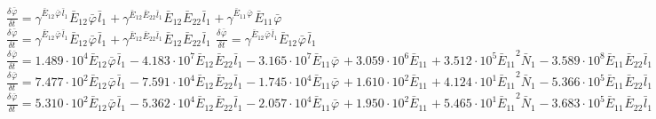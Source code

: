 $\frac{{\delta}^{} {\bar{\varphi}}_{}}{{\delta} {{{t}}_{}}^{}} = {\gamma}^{{{{\bar{E}}_{12}}^{}{{\bar{\varphi}}_{}}^{}{{\bar{l}}_{1}}^{}}}{{{\bar{E}}_{12}}^{}{{\bar{\varphi}}_{}}^{}{{\bar{l}}_{1}}^{}} + {\gamma}^{{{{\bar{E}}_{12}}^{}{{\bar{E}}_{22}}^{}{{\bar{l}}_{1}}^{}}}{{{\bar{E}}_{12}}^{}{{\bar{E}}_{22}}^{}{{\bar{l}}_{1}}^{}} + {\gamma}^{{{{\bar{E}}_{11}}^{}{{\bar{\varphi}}_{}}^{}}}{{{\bar{E}}_{11}}^{}{{\bar{\varphi}}_{}}^{}}$
$\frac{{\delta}^{} {\bar{\varphi}}_{}}{{\delta} {{{t}}_{}}^{}} = {\gamma}^{{{{\bar{E}}_{12}}^{}{{\bar{\varphi}}_{}}^{}{{\bar{l}}_{1}}^{}}}{{{\bar{E}}_{12}}^{}{{\bar{\varphi}}_{}}^{}{{\bar{l}}_{1}}^{}} + {\gamma}^{{{{\bar{E}}_{12}}^{}{{\bar{E}}_{22}}^{}{{\bar{l}}_{1}}^{}}}{{{\bar{E}}_{12}}^{}{{\bar{E}}_{22}}^{}{{\bar{l}}_{1}}^{}}$
$\frac{{\delta}^{} {\bar{\varphi}}_{}}{{\delta} {{{t}}_{}}^{}} = {\gamma}^{{{{\bar{E}}_{12}}^{}{{\bar{\varphi}}_{}}^{}{{\bar{l}}_{1}}^{}}}{{{\bar{E}}_{12}}^{}{{\bar{\varphi}}_{}}^{}{{\bar{l}}_{1}}^{}}$
$\frac{{\delta}^{} {\bar{\varphi}}_{}}{{\delta} {{{t}}_{}}^{}} = 1.489\cdot 10^{4}{{{\bar{E}}_{12}}^{}{{\bar{\varphi}}_{}}^{}{{\bar{l}}_{1}}^{}} - 4.183\cdot 10^{7}{{{\bar{E}}_{12}}^{}{{\bar{E}}_{22}}^{}{{\bar{l}}_{1}}^{}} - 3.165\cdot 10^{7}{{{\bar{E}}_{11}}^{}{{\bar{\varphi}}_{}}^{}} + 3.059\cdot 10^{6}{{{\bar{E}}_{11}}^{}} + 3.512\cdot 10^{5}{{{\bar{E}}_{11}}^{2}{{\bar{N}}_{1}}^{}} - 3.589\cdot 10^{8}{{{\bar{E}}_{11}}^{}{{\bar{E}}_{22}}^{}{{\bar{l}}_{1}}^{}} + 5.223\cdot 10^{6}{{{\bar{E}}_{11}}^{}{{\bar{\varphi}}_{}}^{}{{\bar{l}}_{1}}^{}} + 5.855\cdot 10^{6}{{{\bar{E}}_{22}}^{2}{{\bar{l}}_{1}}^{}} + 7.608\cdot 10^{5}{{{\bar{E}}_{11}}^{}{{\bar{E}}_{22}}^{}{{\bar{l}}_{2}}^{}} - 4.437\cdot 10^{8}{{{\bar{E}}_{22}}^{}{{\bar{\varphi}}_{}}^{}{{\bar{l}}_{1}}^{}}$
$\frac{{\delta}^{} {\bar{\varphi}}_{}}{{\delta} {{{t}}_{}}^{}} = 7.477\cdot 10^{2}{{{\bar{E}}_{12}}^{}{{\bar{\varphi}}_{}}^{}{{\bar{l}}_{1}}^{}} - 7.591\cdot 10^{4}{{{\bar{E}}_{12}}^{}{{\bar{E}}_{22}}^{}{{\bar{l}}_{1}}^{}} - 1.745\cdot 10^{4}{{{\bar{E}}_{11}}^{}{{\bar{\varphi}}_{}}^{}} + 1.610\cdot 10^{2}{{{\bar{E}}_{11}}^{}} + 4.124\cdot 10^{1}{{{\bar{E}}_{11}}^{2}{{\bar{N}}_{1}}^{}} - 5.366\cdot 10^{5}{{{\bar{E}}_{11}}^{}{{\bar{E}}_{22}}^{}{{\bar{l}}_{1}}^{}} + 1.875\cdot 10^{2}{{{\bar{E}}_{11}}^{}{{\bar{\varphi}}_{}}^{}{{\bar{l}}_{1}}^{}} + 5.163\cdot 10^{3}{{{\bar{E}}_{22}}^{2}{{\bar{l}}_{1}}^{}} + 4.682{{{\bar{E}}_{11}}^{}{{\bar{E}}_{22}}^{}{{\bar{l}}_{2}}^{}}$
$\frac{{\delta}^{} {\bar{\varphi}}_{}}{{\delta} {{{t}}_{}}^{}} = 5.310\cdot 10^{2}{{{\bar{E}}_{12}}^{}{{\bar{\varphi}}_{}}^{}{{\bar{l}}_{1}}^{}} - 5.362\cdot 10^{4}{{{\bar{E}}_{12}}^{}{{\bar{E}}_{22}}^{}{{\bar{l}}_{1}}^{}} - 2.057\cdot 10^{4}{{{\bar{E}}_{11}}^{}{{\bar{\varphi}}_{}}^{}} + 1.950\cdot 10^{2}{{{\bar{E}}_{11}}^{}} + 5.465\cdot 10^{1}{{{\bar{E}}_{11}}^{2}{{\bar{N}}_{1}}^{}} - 3.683\cdot 10^{5}{{{\bar{E}}_{11}}^{}{{\bar{E}}_{22}}^{}{{\bar{l}}_{1}}^{}} + 1.200\cdot 10^{2}{{{\bar{E}}_{11}}^{}{{\bar{\varphi}}_{}}^{}{{\bar{l}}_{1}}^{}} + 3.550\cdot 10^{3}{{{\bar{E}}_{22}}^{2}{{\bar{l}}_{1}}^{}}$
